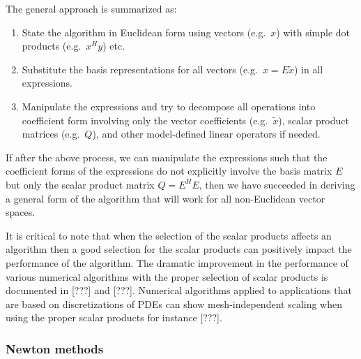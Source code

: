 The general approach is summarized as:

\begin{enumerate}

{}\item State the algorithm in Euclidean form using vectors (e.g.\ $x$) with
simple dot products (e.g.\ $x^H y$) etc.

{}\item Substitute the basis representations for all vectors (e.g.\ $x = E
{}\tilde{x}$) in all expressions.

{}\item Manipulate the expressions and try to decompose all operations into
coefficient form involving only the vector coefficients (e.g.\ $\tilde{x}$),
scalar product matrices (e.g.\ $Q$), and other model-defined linear operators
if needed.

\end{enumerate}

If after the above process, we can manipulate the expressions such that the
coefficient forms of the expressions do not explicitly involve the basis
matrix $E$ but only the scalar product matrix $Q = E^H E$, then we have
succeeded in deriving a general form of the algorithm that will work for all
non-Euclidean vector spaces.

It is critical to note that when the selection of the scalar products affects
an algorithm then a good selection for the scalar products can positively
impact the performance of the algorithm.  The dramatic improvement in the
performance of various numerical algorithms with the proper selection of
scalar products is documented in [???] and [???].  Numerical algorithms
applied to applications that are based on discretizations of PDEs can show
mesh-independent scaling when using the proper scalar products for instance
[???].

\subsubsection{Newton methods}

